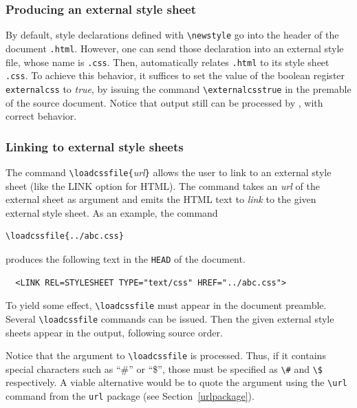 \subsubsection{Producing an external style sheet}
%
%
By default,  style declarations defined with
\verb+\newstyle+ go into the header of the \html{} document
\texttt{.html}.
However, one can send those declaration into an external style file,
whose name is \texttt{.css}.
Then, \hevea{} automatically relates \texttt{.html} to
its style sheet  \texttt{.css}.
To achieve this behavior, it suffices to set the value of the boolean
register \texttt{externalcss} to \textit{true}, by issuing the command
\verb+\externalcsstrue+ in the premable of the source document.
Notice that \hevea{} output still can be processed by \hacha{}, with
correct behavior.


\subsubsection{Linking to external style sheets}
%
%
The \hevea{} command \verb+\loadcssfile{+\textit{url}\verb+}+ allows the
user to link to an external style sheet (like the LINK option for
HTML). The command takes an \textit{url} of the external
sheet as argument and emits the HTML text to
\emph{link} to the given external style sheet. As an example, the command
\begin{verbatim}
\loadcssfile{../abc.css}
\end{verbatim}
produces the following \html{} text in the \verb+HEAD+ of the document.
\begin{verbatim}
  <LINK REL=STYLESHEET TYPE="text/css" HREF="../abc.css">
\end{verbatim} 
To yield some effect, \verb+\loadcssfile+ must appear in the document
preamble.  Several \verb+\loadcssfile+ commands can be issued.  Then
the given external style sheets appear in the output, following source
order.

Notice that the argument to \verb+\loadcssfile+ is processed. Thus, if it
contains special characters such as ``\#'' or ``\$'', those must be specified
as \verb+\#+ and \verb+\$+ respectively.
A viable alternative would be to quote
the argument using the \verb+\url+ command from the \texttt{url}
package (see Section~\ref{urlpackage}).

